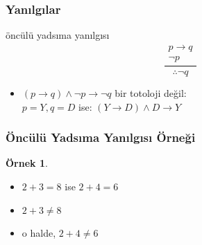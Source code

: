 \documentclass[dvipsnames]{beamer}
\theoremstyle{definition}
\theoremstyle{example}
\newtheorem{ornek}[theorem]{Örnek}
\theoremstyle{plain}
\begin{document}
\begin{frame}
  \frametitle{Yanılgılar}

  \begin{block}{öncülü yadsıma yanılgısı}
    \[
    \frac
      {
        \begin{array}{c}
          p \rightarrow q\\
          \neg p
        \end{array}
      }
      {
        \therefore \neg q
      }
    \]
  \end{block}

  \pause
  \begin{itemize}
    \item $(p \rightarrow q) \wedge \neg p \rightarrow \neg q$ bir totoloji
      değil:\\
      $p=Y,q=D$ ise: $(Y \rightarrow D) \wedge D \rightarrow Y$
  \end{itemize}
\end{frame}

\begin{frame}
  \frametitle{Öncülü Yadsıma Yanılgısı Örneği}

  \begin{ornek}
    \begin{itemize}
      \item $2+3=8$ ise $2+4=6$
      \item $2+3 \neq 8$

      \pause
      \medskip
      \item o halde, $2+4 \neq 6$
    \end{itemize}
  \end{ornek}
\end{frame}
\end{document}
